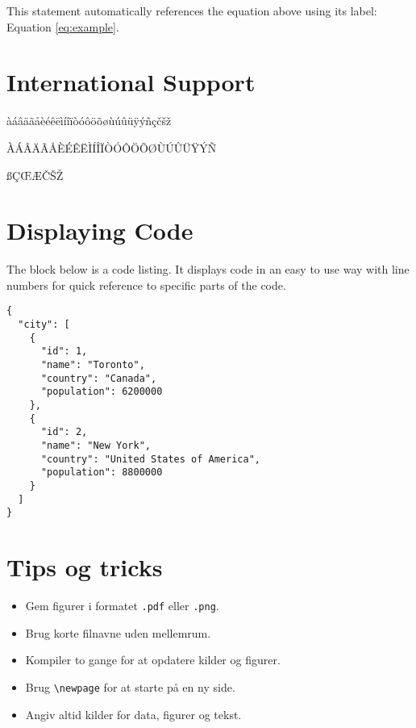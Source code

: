 This statement automatically references the equation above using its label: Equation \ref{eq:example}.


\section{International Support}

àáâäãåèéêëìíîïòóôöõøùúûüÿýñçčšž

ÀÁÂÄÃÅÈÉÊËÌÍÎÏÒÓÔÖÕØÙÚÛÜŸÝÑ

ßÇŒÆČŠŽ


\section{Displaying Code}

The block below is a code listing. It displays code in an easy to use way with line numbers for quick reference to specific parts of the code.

\begin{lstlisting}
{
  "city": [
    {
      "id": 1,
      "name": "Toronto",
      "country": "Canada",
      "population": 6200000
    },
    {
      "id": 2,
      "name": "New York",
      "country": "United States of America",
      "population": 8800000
    }
  ]
}
\end{lstlisting}

\newpage

\section{Tips og tricks}

\begin{itemize}
  \item Gem figurer i formatet \texttt{.pdf} eller \texttt{.png}.
  \item Brug korte filnavne uden mellemrum.
  \item Kompiler to gange for at opdatere kilder og figurer.
  \item Brug \texttt{\textbackslash newpage} for at starte på en ny side.
  \item Angiv altid kilder for data, figurer og tekst.
\end{itemize}

